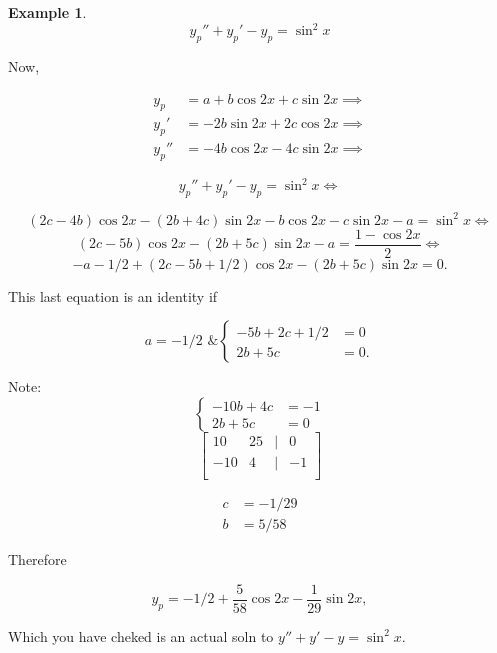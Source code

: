 \documentclass[12pt,a4paper]{article}
\theoremstyle{definition}
\newtheorem*{example}{Example}
\begin{document}
\begin{example}
  \[ y_p'' + y_p' - y_p = \sin^2x \]

  Now, 

  \begin{align*}
    y_p &= a + b\cos 2x + c \sin 2x \implies \\
    y_p' &= -2b\sin2x + 2c\cos2x \implies \\
    y_p'' &= -4b\cos2x -4c\sin2x \implies
  \end{align*}

  \[ y_p'' + y_p' - y_p = \sin^2x \iff \]

  \[ (2c-4b)\cos2x - (2b+4c)\sin2x - b\cos2x -c\sin2x -a = \sin^2x \iff \]
  \[ (2c-5b)\cos2x - (2b+5c)\sin2x -a = \frac{1-\cos2x}{2} \iff \]
  \[ -a-1/2+(2c-5b+1/2)\cos2x - (2b+5c)\sin2x = 0. \]

  This last equation is an identity if 

  \[ a = -1/2 \text{ \& } 
  \begin{cases}
    -5b + 2c + 1/2 &= 0 \\
    2b + 5c &=0.
  \end{cases}
  \]

  Note:
  \[
  \begin{cases}
    -10b + 4c &= -1 \\
    2b + 5c &= 0
  \end{cases}
  \]
  \[
  \begin{bmatrix}
    10 & 25 & | & 0 \\
    -10 & 4 & | & -1 \\
  \end{bmatrix}
  \]

  \begin{align*}
    c &= -1/29 \\
    b &= 5/58
  \end{align*}

  Therefore

  \[ y_p = -1/2 + \frac{5}{58} \cos2x - \frac{1}{29}\sin2x, \]

  Which you have cheked is an actual soln to \( y'' + y' -y = \sin^2x. \)

\end{example}

\end{document}
